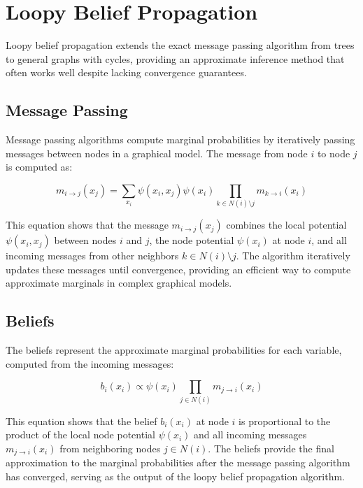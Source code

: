 
\section{Loopy Belief Propagation }
\label{sec:loopy-bp}

Loopy belief propagation extends the exact message passing algorithm from trees to general graphs with cycles, providing an approximate inference method that often works well despite lacking convergence guarantees.

\subsection{Message Passing}

Message passing algorithms compute marginal probabilities by iteratively passing messages between nodes in a graphical model. The message from node $i$ to node $j$ is computed as:

\begin{equation}
m_{i \to j}(x_j) = \sum_{x_i} \psi(x_i, x_j) \psi(x_i) \prod_{k \in N(i) \setminus j} m_{k \to i}(x_i)
\end{equation}

This equation shows that the message $m_{i \to j}(x_j)$ combines the local potential $\psi(x_i, x_j)$ between nodes $i$ and $j$, the node potential $\psi(x_i)$ at node $i$, and all incoming messages from other neighbors $k \in N(i) \setminus j$. The algorithm iteratively updates these messages until convergence, providing an efficient way to compute approximate marginals in complex graphical models.

\subsection{Beliefs}

The beliefs represent the approximate marginal probabilities for each variable, computed from the incoming messages:

\begin{equation}
b_i(x_i) \propto \psi(x_i) \prod_{j \in N(i)} m_{j \to i}(x_i)
\end{equation}

This equation shows that the belief $b_i(x_i)$ at node $i$ is proportional to the product of the local node potential $\psi(x_i)$ and all incoming messages $m_{j \to i}(x_i)$ from neighboring nodes $j \in N(i)$. The beliefs provide the final approximation to the marginal probabilities after the message passing algorithm has converged, serving as the output of the loopy belief propagation algorithm.

